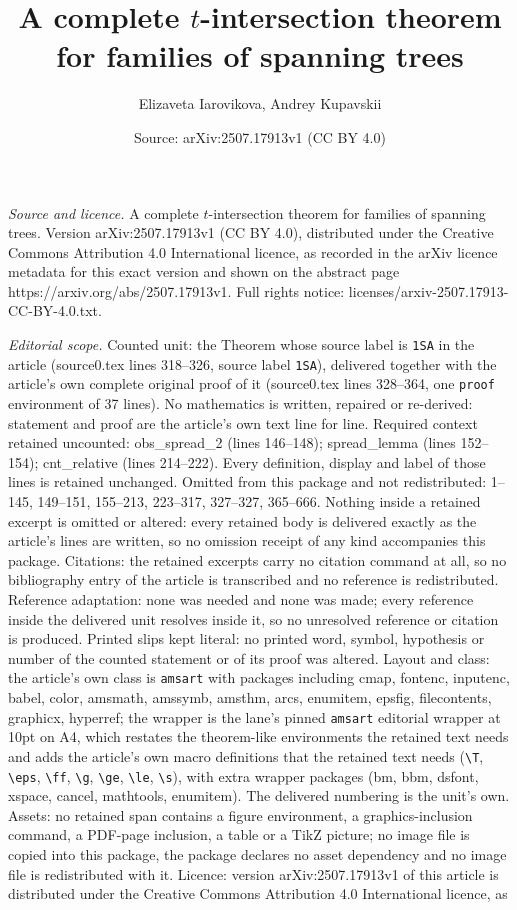 \documentclass[10pt,a4paper]{amsart}
\title[A complete $t$-intersection theorem for families of spanning]{A complete $t$-intersection theorem for families of spanning trees}
\author{Elizaveta Iarovikova, Andrey Kupavskii}
\date{Source: arXiv:2507.17913v1 (CC BY 4.0)}
\begin{document}
\maketitle

\noindent\emph{Source and licence.} A complete $t$-intersection theorem for families of spanning trees. Version arXiv:2507.17913v1 (CC BY 4.0), distributed under the Creative Commons Attribution 4.0 International licence, as recorded in the arXiv licence metadata for this exact version and shown on the abstract page https://arxiv.org/abs/2507.17913v1. Full rights notice: licenses/arxiv-2507.17913-CC-BY-4.0.txt.\par\smallskip

\noindent\textit{Editorial scope.} Counted unit: the Theorem whose source label is \texttt{1SA} in the article (source0.tex lines 318--326, source label \texttt{1SA}), delivered together with the article's own complete original proof of it (source0.tex lines 328--364, one \texttt{proof} environment of 37 lines). No mathematics is written, repaired or re-derived: statement and proof are the article's own text line for line. Required context retained uncounted: obs\_spread\_2 (lines 146--148); spread\_lemma (lines 152--154); cnt\_relative (lines 214--222). Every definition, display and label of those lines is retained unchanged. Omitted from this package and not redistributed: 1--145, 149--151, 155--213, 223--317, 327--327, 365--666. Nothing inside a retained excerpt is omitted or altered: every retained body is delivered exactly as the article's lines are written, so no omission receipt of any kind accompanies this package. Citations: the retained excerpts carry no citation command at all, so no bibliography entry of the article is transcribed and no reference is redistributed. Reference adaptation: none was needed and none was made; every reference inside the delivered unit resolves inside it, so no unresolved reference or citation is produced. Printed slips kept literal: no printed word, symbol, hypothesis or number of the counted statement or of its proof was altered. Layout and class: the article's own class is \texttt{amsart} with packages including cmap, fontenc, inputenc, babel, color, amsmath, amssymb, amsthm, arcs, enumitem, epsfig, filecontents, graphicx, hyperref; the wrapper is the lane's pinned \texttt{amsart} editorial wrapper at 10pt on A4, which restates the theorem-like environments the retained text needs and adds the article's own macro definitions that the retained text needs (\texttt{\textbackslash T}, \texttt{\textbackslash eps}, \texttt{\textbackslash ff}, \texttt{\textbackslash g}, \texttt{\textbackslash ge}, \texttt{\textbackslash le}, \texttt{\textbackslash s}), with extra wrapper packages (bm, bbm, dsfont, xspace, cancel, mathtools, enumitem). The delivered numbering is the unit's own. Assets: no retained span contains a figure environment, a graphics-inclusion command, a PDF-page inclusion, a table or a TikZ picture; no image file is copied into this package, the package declares no asset dependency and no image file is redistributed with it. Licence: version arXiv:2507.17913v1 of this article is distributed under the Creative Commons Attribution 4.0 International licence, as 
\end{document}
